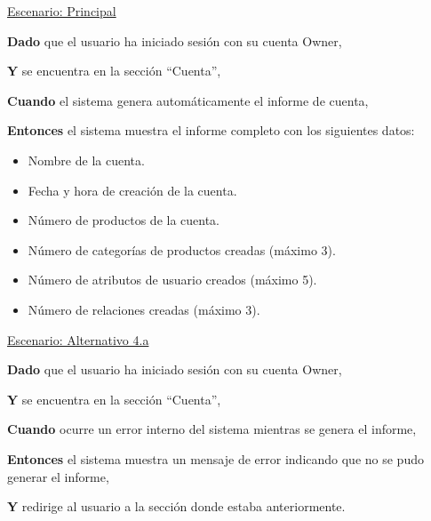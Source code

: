 \underline{Escenario: Principal}\par
\vspace{0.15cm}
\textbf{Dado} que el usuario ha iniciado sesión con su cuenta Owner,\par
\textbf{Y} se encuentra en la sección \enquote{Cuenta},\par
\textbf{Cuando} el sistema genera automáticamente el informe de cuenta,\par
\textbf{Entonces} el sistema muestra el informe completo con los siguientes datos:\par
\begin{itemize}
    \item Nombre de la cuenta.
    \item Fecha y hora de creación de la cuenta.
    \item Número de productos de la cuenta.
    \item Número de categorías de productos creadas (máximo 3).
    \item Número de atributos de usuario creados (máximo 5).
    \item Número de relaciones creadas (máximo 3).
\end{itemize}
\vspace{0.20cm}


\underline{Escenario: Alternativo 4.a}\par
\vspace{0.15cm}
\textbf{Dado} que el usuario ha iniciado sesión con su cuenta Owner,\par
\textbf{Y} se encuentra en la sección \enquote{Cuenta},\par
\textbf{Cuando} ocurre un error interno del sistema mientras se genera el informe,\par
\textbf{Entonces} el sistema muestra un mensaje de error indicando que no se pudo generar el informe,\par
\textbf{Y} redirige al usuario a la sección donde estaba anteriormente.\par
\vspace{0.20cm}

\newpage %

